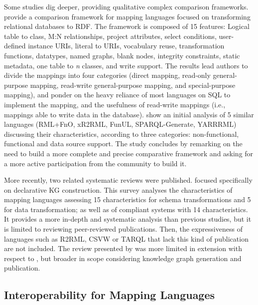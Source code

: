 Some studies dig deeper, providing qualitative complex comparison frameworks. \cite{hert2011comparison} provide a comparison framework for mapping languages focused on transforming relational databases to RDF. The framework is composed of 15 features: Logical table to class, M:N relationships, project attributes, select conditions, user-defined instance URIs, literal to URIs, vocabulary reuse, transformation functions, datatypes, named graphs, blank nodes, integrity constraints, static metadata, one table to \textit{n} classes, and write support. 
The results lead authors to divide the mappings into four categories (direct mapping, read-only general-purpose mapping, read-write general-purpose mapping, and special-purpose mapping), and ponder on the heavy reliance of most languages on SQL to implement the mapping, and the usefulness of read-write mappings (i.e., mappings able to write data in the database). \cite{DeMeester2019comparison} show an initial analysis of 5 similar languages (RML+FnO, xR2RML, FunUL, SPARQL-Generate, YARRRML) discussing their characteristics, according to three categories: non-functional, functional and data source support. The study concludes by remarking on the need to build a more complete and precise comparative framework and asking for a more active participation from the community to build it. 

More recently, two related systematic reviews were published. \cite{vanassche2023survey} focused specifically on declarative KG construction. This survey analyses the characteristics of mapping languages assessing 15 characteristics for schema transformations and 5 for data transformation; as well as of compliant systems with 14 characteristics. It provides a more in-depth and systematic analysis than previous studies, but it is limited to reviewing peer-reviewed publications. Then, the expressiveness of languages such as R2RML, CSVW or TARQL that lack this kind of publication are not included. The review presented by \cite{ryen2022kgreview} was more limited in extension with respect to \cite{vanassche2023survey}, but broader in scope considering knowledge graph generation and publication. %

\subsection{Interoperability for Mapping Languages}
\label{sec:chp2_interoperability}

